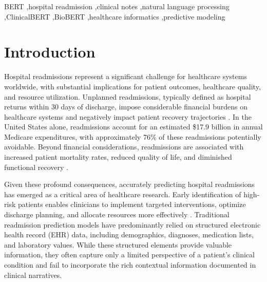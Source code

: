 \documentclass[3p,times,procedia]{elsarticle}
\begin{document}
\begin{frontmatter}
\begin{keyword}
BERT \sep hospital readmission \sep clinical notes \sep natural language processing \sep ClinicalBERT \sep BioBERT \sep healthcare informatics \sep predictive modeling
\end{keyword}
\end{frontmatter}






\section{Introduction}\label{introduction}

Hospital readmissions represent a significant challenge for healthcare systems worldwide, with substantial implications for patient outcomes, healthcare quality, and resource utilization. Unplanned readmissions, typically defined as hospital returns within 30 days of discharge, impose considerable financial burdens on healthcare systems and negatively impact patient recovery trajectories \cite{Huang2020}. In the United States alone, readmissions account for an estimated \$17.9 billion in annual Medicare expenditures, with approximately 76\% of these readmissions potentially avoidable. Beyond financial considerations, readmissions are associated with increased patient mortality rates, reduced quality of life, and diminished functional recovery \cite{Matondora2024}.

Given these profound consequences, accurately predicting hospital readmissions has emerged as a critical area of healthcare research. Early identification of high-risk patients enables clinicians to implement targeted interventions, optimize discharge planning, and allocate resources more effectively \cite{Kumar2025}. Traditional readmission prediction models have predominantly relied on structured electronic health record (EHR) data, including demographics, diagnoses, medication lists, and laboratory values. While these structured elements provide valuable information, they often capture only a limited perspective of a patient's clinical condition and fail to incorporate the rich contextual information documented in clinical narratives.
\end{document}
